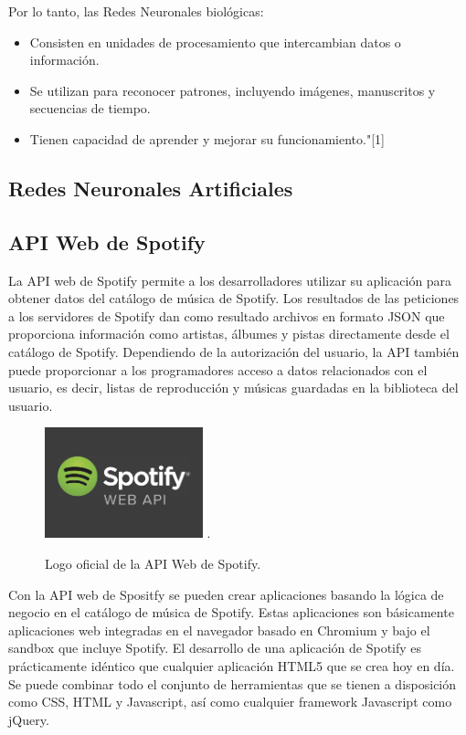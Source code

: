 \documentclass[conference]{IEEEtran}
\begin{document}
Por lo tanto, las Redes Neuronales biológicas:

\begin{itemize}
	\item Consisten en unidades de procesamiento que intercambian datos o información.
	\item Se utilizan para reconocer patrones, incluyendo imágenes, manuscritos y secuencias de tiempo.
	\item Tienen capacidad de aprender y mejorar su funcionamiento."[1]
\end{itemize}

\subsection{Redes Neuronales Artificiales \\}


\subsection{API Web de Spotify \\}
La API web de Spotify permite a los desarrolladores utilizar su aplicación para obtener datos del catálogo de música de Spotify. Los resultados de las peticiones a los servidores de Spotify dan como resultado archivos en formato JSON que proporciona información como artistas, álbumes y pistas directamente desde el catálogo de Spotify. Dependiendo de la autorización del usuario, la API también puede proporcionar a los programadores acceso a datos relacionados con el usuario, es decir, listas de reproducción y músicas guardadas en la biblioteca del usuario.\\

\begin{figure}[ht]
    \centering
    \includegraphics[width=1.8in]{./images/APIWebSpotify.jpg}
    \DeclareGraphicsExtensions.
    \caption{ Logo oficial de la API Web de Spotify. }
\end{figure}

Con la API web de Spositfy se pueden crear aplicaciones basando la lógica de negocio en el catálogo de música de Spotify. Estas aplicaciones son básicamente aplicaciones web integradas en el navegador basado en Chromium y bajo el sandbox que incluye Spotify. El desarrollo de una aplicación de Spotify es prácticamente idéntico que cualquier aplicación HTML5 que se crea hoy en día. Se puede combinar todo el conjunto de herramientas que se tienen a disposición como CSS, HTML y Javascript, así como cualquier framework Javascript como jQuery.
\end{document}
